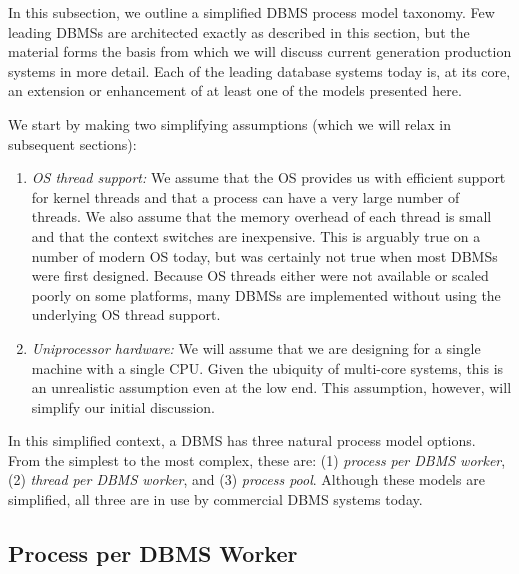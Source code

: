 \documentclass[b5paper,11pt,twoside,openright]{book}
\begin{document}
In this subsection, we outline a simplified DBMS process model taxonomy.
Few leading DBMSs are architected exactly as described in this section,
but the material forms the basis from which we will discuss current
generation production systems in more detail. Each of the leading
database systems today is, at its core, an extension or enhancement of
at least one of the models presented here.

We start by making two simplifying assumptions (which we will relax in
subsequent sections):

\begin{enumerate}
\def\labelenumi{\arabic{enumi}.}
\item
  \emph{OS thread support:} We assume that the OS provides us with
  efficient support for kernel threads and that a process can have a
  very large number of threads. We also assume that the memory overhead
  of each thread is small and that the context switches are inexpensive.
  This is arguably true on a number of modern OS today, but was
  certainly not true when most DBMSs were first designed. Because OS
  threads either were not available or scaled poorly on some platforms,
  many DBMSs are implemented without using the underlying OS thread
  support.
\item
  \emph{Uniprocessor hardware:} We will assume that we are designing for
  a single machine with a single CPU. Given the ubiquity of multi-core
  systems, this is an unrealistic assumption even at the low end. This
  assumption, however, will simplify our initial discussion.
\end{enumerate}

In this simplified context, a DBMS has three natural process model
options. From the simplest to the most complex, these are: (1)
\emph{process} \emph{per DBMS worker}, (2) \emph{thread per DBMS
worker}, and (3) \emph{process pool}. Although these models are
simplified, all three are in use by commercial DBMS systems today.

\hypertarget{process-per-dbms-worker}{%
\subsection{Process per DBMS
Worker}\label{process-per-dbms-worker}}
\end{document}
